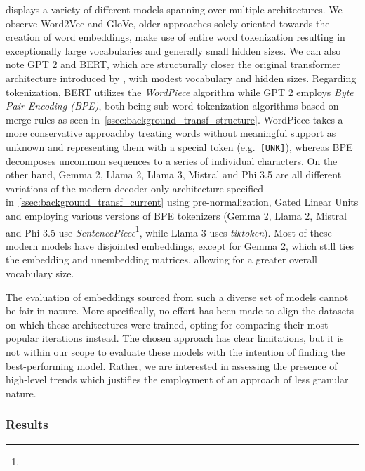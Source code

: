  displays a variety of different models spanning over multiple architectures.
We observe Word2Vec and GloVe, older approaches solely oriented towards the creation of word embeddings, make use of entire word tokenization resulting in exceptionally large vocabularies and generally small hidden sizes.
We can also note GPT 2 and BERT, which are structurally closer the original transformer architecture introduced by \citet{vaswani2017}, with modest vocabulary and hidden sizes.
Regarding tokenization, BERT utilizes the \emph{WordPiece} algorithm while GPT 2 employs \emph{Byte Pair Encoding (BPE)}, both being sub-word tokenization algorithms based on merge rules as seen in~\cref{ssec:background_transf_structure}.
WordPiece takes a more conservative approachby treating words without meaningful support as unknown and representing them with a special token (e.g.\ \texttt{[UNK]}), whereas BPE decomposes uncommon sequences to a series of individual characters.
On the other hand, Gemma 2, Llama 2, Llama 3, Mistral and Phi 3.5 are all different variations of the modern decoder-only architecture specified in~\cref{ssec:background_transf_current} using pre-normalization, Gated Linear Units and employing various versions of BPE tokenizers (Gemma 2, Llama 2, Mistral and Phi 3.5 use \emph{SentencePiece}\footnote{}, while Llama 3 uses \emph{tiktoken}\footnotemark).
Most of these modern models have disjointed embeddings, except for Gemma 2, which still ties the embedding and unembedding matrices, allowing for a greater overall vocabulary size.


The evaluation of embeddings sourced from such a diverse set of models cannot be fair in nature.
More specifically, no effort has been made to align the datasets on which these architectures were trained, opting for comparing their most popular iterations instead.
The chosen approach has clear limitations, but it is not within our scope to evaluate these models with the intention of finding the best-performing model.
Rather, we are interested in assessing the presence of high-level trends which justifies the employment of an approach of less granular nature.

\subsubsection{Results}\label{sssec:exp_emb_exp1_results}

